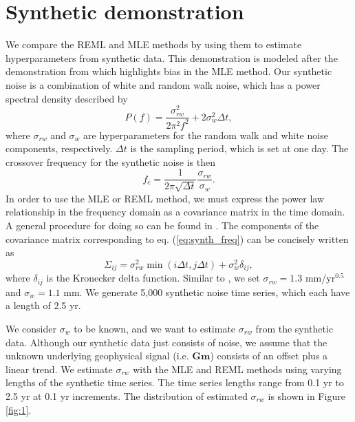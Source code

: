 \documentclass{svjour3}                     %
\begin{document}
\section{Synthetic demonstration}\label{sec:3}
We compare the REML and MLE methods by using them to estimate hyperparameters from synthetic data. This demonstration is modeled after the demonstration from \citet{Langbein2012} which highlights bias in the MLE method. Our synthetic noise is a combination of white and random walk noise, which has a power spectral density described by
\begin{equation}\label{eq:synth_freq}
P(f) = \frac{\sigma_{rw}^2}{2\pi^2 f^2} + 2\sigma_w^2\Delta t,
\end{equation}  
where $\sigma_{rw}$ and $\sigma_w$ are hyperparameters for the random walk and white noise components, respectively. $\Delta t$ is the sampling period, which is set at one day. The crossover frequency for the synthetic noise is then
\begin{equation}
f_c = \frac{1}{2\pi\sqrt{\Delta t}}\frac{\sigma_{rw}}{\sigma_w}.  
\end{equation}
In order to use the MLE or REML method, we must express the power law relationship in the frequency domain as a covariance matrix in the time domain. A general procedure for doing  so can be found in \citet{Langbein2004}. The components of the covariance matrix corresponding to eq. (\ref{eq:synth_freq}) can be concisely written as
\begin{equation}
\Sigma_{ij} = \sigma_{rw}^2 \min(i\Delta t,j\Delta t) + \sigma_w^2 \delta_{ij},
\end{equation} 
where $\delta_{ij}$ is the Kronecker delta function. Similar to \citet{Langbein2012}, we set $\sigma_{rw} = 1.3$ mm/yr$^{0.5}$ and $\sigma_w = 1.1$ mm. We generate 5,000 synthetic noise time series, which each have a length of 2.5 yr. 

We consider $\sigma_w$ to be known, and we want to estimate $\sigma_{rw}$ from the synthetic data. Although our synthetic data just consists of noise, we assume that the unknown underlying geophysical signal (i.e. $\mathbf{G}\mathbf{m}$) consists of an offset plus a linear trend. We estimate $\sigma_{rw}$ with the MLE and REML methods using varying lengths of the synthetic time series. The time series lengths range from 0.1 yr to 2.5 yr at 0.1 yr increments. The distribution of estimated $\sigma_{rw}$ is shown in Figure \ref{fig:1}. 
\end{document}
